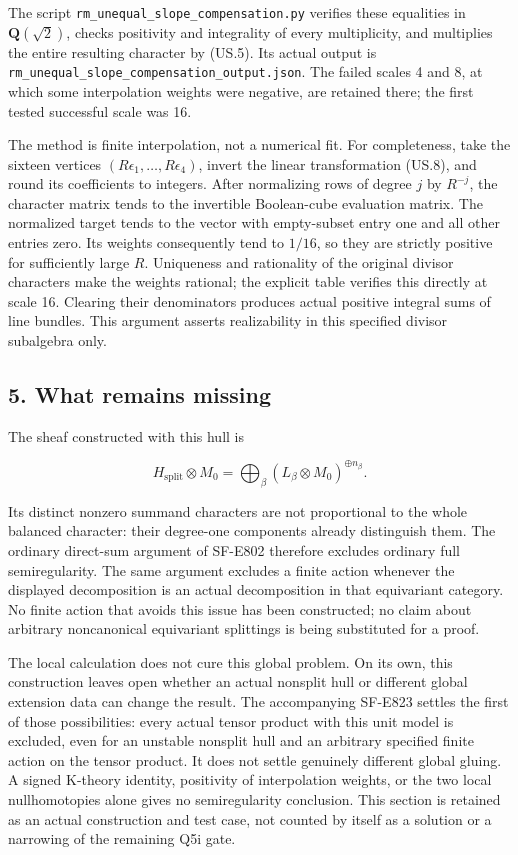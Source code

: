 The script \texttt{rm\_unequal\_slope\_compensation.py} verifies these
equalities in \(\mathbf Q(\sqrt2)\), checks positivity and integrality
of every multiplicity, and multiplies the entire resulting character by
(US.5). Its actual output is
\texttt{rm\_unequal\_slope\_compensation\_output.json}. The failed
scales 4 and 8, at which some interpolation weights were negative, are
retained there; the first tested successful scale was 16.

The method is finite interpolation, not a numerical fit. For
completeness, take the sixteen vertices
\((R\epsilon_1,\ldots,R\epsilon_4)\), invert the linear transformation
(US.8), and round its coefficients to integers. After normalizing rows
of degree \(j\) by \(R^{-j}\), the character matrix tends to the
invertible Boolean-cube evaluation matrix. The normalized target tends
to the vector with empty-subset entry one and all other entries zero.
Its weights consequently tend to \(1/16\), so they are strictly positive
for sufficiently large \(R\). Uniqueness and rationality of the original
divisor characters make the weights rational; the explicit table
verifies this directly at scale 16. Clearing their denominators produces
actual positive integral sums of line bundles. This argument asserts
realizability in this specified divisor subalgebra only.

\subsection{5. What remains missing}\label{SF-US-what-remains-missing}

The sheaf constructed with this hull is

\[
 H_{\mathrm{split}}\otimes M_0
   =\bigoplus_\beta (L_\beta\otimes M_0)^{\oplus n_\beta}.
\]

Its distinct nonzero summand characters are not proportional to the
whole balanced character: their degree-one components already
distinguish them. The ordinary direct-sum argument of SF-E802 therefore
excludes ordinary full semiregularity. The same argument excludes a
finite action whenever the displayed decomposition is an actual
decomposition in that equivariant category. No finite action that avoids
this issue has been constructed; no claim about arbitrary noncanonical
equivariant splittings is being substituted for a proof.

The local calculation does not cure this global problem. On its own,
this construction leaves open whether an actual nonsplit hull or
different global extension data can change the result. The accompanying
SF-E823 settles the first of those possibilities: every actual tensor
product with this unit model is excluded, even for an unstable nonsplit
hull and an arbitrary specified finite action on the tensor product. It
does not settle genuinely different global gluing. A signed K-theory
identity, positivity of interpolation weights, or the two local
nullhomotopies alone gives no semiregularity conclusion. This section is
retained as an actual construction and test case, not counted by itself
as a solution or a narrowing of the remaining Q5i gate.
